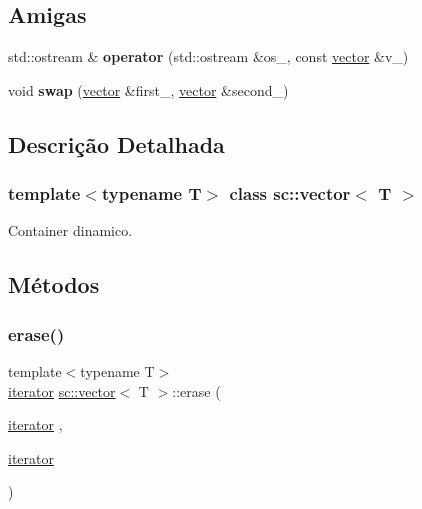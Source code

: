 \subsection*{Amigas}
\begin{DoxyCompactItemize}
\item 
\mbox{\label{classsc_1_1vector_a889e37c4415a33fb90d8b564bf428e24}} 
std\+::ostream \& {\bfseries operator} (std\+::ostream \&os\+\_\+, const \hyperlink{classsc_1_1vector}{vector} \&v\+\_\+)
\item 
\mbox{\label{classsc_1_1vector_a9198beeb05f24ba2eadccab0a606063c}} 
void {\bfseries swap} (\hyperlink{classsc_1_1vector}{vector} \&first\+\_\+, \hyperlink{classsc_1_1vector}{vector} \&second\+\_\+)
\end{DoxyCompactItemize}


\subsection{Descrição Detalhada}
\subsubsection*{template$<$typename T$>$\newline
class sc\+::vector$<$ T $>$}

Container dinamico. 

\subsection{Métodos}
\mbox{\label{classsc_1_1vector_a916036c5dc2ec3dacea42f08706bce33}} 
\subsubsection{\texorpdfstring{erase()}{erase()}\hspace{0.1cm}{\footnotesize\ttfamily [1/2]}}
{\footnotesize\ttfamily template$<$typename T$>$ \\
\hyperlink{classsc_1_1vector_a9e5d5cc35e379aa27a93989f4a71413c}{iterator} \hyperlink{classsc_1_1vector}{sc\+::vector}$<$ T $>$\+::erase (\begin{DoxyParamCaption}\item[{\hyperlink{classsc_1_1vector_a9e5d5cc35e379aa27a93989f4a71413c}{iterator}}]{,  }\item[{\hyperlink{classsc_1_1vector_a9e5d5cc35e379aa27a93989f4a71413c}{iterator}}]{ }\end{DoxyParamCaption})}

